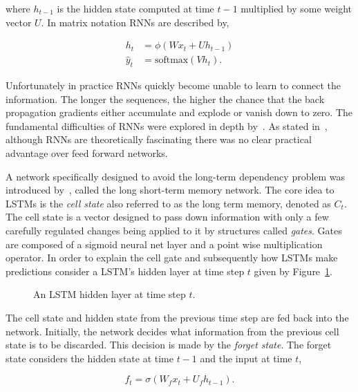 where \(h_{t-1}\) is the hidden state computed at time \(t-1\) multiplied by
some weight vector \(U\). In matrix notation RNNs are described by,

\begin{align}\label{eq:recurrent_neural_network_equations}
    h_t & = \phi(Wx_t + Uh_{t-1}) \\
    \hat{y}_t & = \text{softmax}(Vh_t).
\end{align}

Unfortunately in practice RNNs quickly become unable to learn to connect the
information. The longer the sequences, the higher the chance that
the back propagation gradients either accumulate and explode or vanish down to
zero. The fundamental difficulties of RNNs were explored in depth
by~\cite{Bengio1994}. As stated in~\cite{Hochreiter1997}, although RNNs are
theoretically fascinating there was no clear practical advantage over feed
forward networks.

A network specifically designed to avoid the long-term dependency problem was
introduced by~\cite{Hochreiter1997}, called the long short-term memory
network.
The core idea to LSTMs is the \textit{cell state} also referred to as the
long term memory, denoted as \(C_t\). The cell state is a vector designed to pass down
information with only a few carefully regulated changes being applied to it
by structures called \textit{gates}. Gates are composed of a sigmoid neural
net layer and a point wise multiplication operator. In order to explain
the cell gate and subsequently how LSTMs make predictions consider
a LSTM's hidden layer at time step \(t\) given by Figure~\ref{fig:lstm_cell}.

\begin{figure}[!htbp]
    \centering
    
    \caption{An LSTM hidden layer at time step \(t\).}\label{fig:lstm_cell}
\end{figure}

The cell state and hidden state from the previous time step are fed back
into the network. Initially, the network decides what information from the
previous cell state is to be discarded. This decision is made by the
\textit{forget state}. The forget state considers the hidden state at time
\(t-1\) and the input at time \(t\),

\begin{equation}\label{eq:forget_gate}
    f_{t} = \sigma(W_{f}x_{t} + U_{f}h_{t-1}).
\end{equation}

